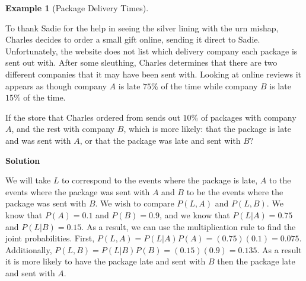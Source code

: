 \documentclass[
  letterpaper,
  DIV=11,
  numbers=noendperiod]{scrreprt}
\theoremstyle{definition}
\theoremstyle{definition}
\theoremstyle{definition}
\newtheorem{example}{Example}[chapter]
\theoremstyle{remark}
\begin{document}
\begin{example}[Package Delivery
Times]\protect\hypertarget{exm-package-delivery-times}{}\label{exm-package-delivery-times}

To thank Sadie for the help in seeing the silver lining with the urn
mishap, Charles decides to order a small gift online, sending it direct
to Sadie. Unfortunately, the website does not list which delivery
company each package is sent out with. After some sleuthing, Charles
determines that there are two different companies that it may have been
sent with. Looking at online reviews it appears as though company \(A\)
is late \(75\%\) of the time while company \(B\) is late \(15\%\) of the
time.

If the store that Charles ordered from sends out \(10\%\) of packages
with company \(A\), and the rest with company \(B\), which is more
likely: that the package is late and was sent with \(A\), or that the
package was late and sent with \(B\)?

\begin{tcolorbox}[enhanced jigsaw, colback=white, breakable, rightrule=.15mm, leftrule=.75mm, toprule=.15mm, left=2mm, arc=.35mm, opacityback=0, bottomrule=.15mm]

\vspace{-3mm}\textbf{Solution}\vspace{3mm}

We will take \(L\) to correspond to the events where the package is
late, \(A\) to the events where the package was sent with \(A\) and
\(B\) to be the events where the package was sent with \(B\). We wish to
compare \(P(L, A)\) and \(P(L, B)\). We know that \(P(A) = 0.1\) and
\(P(B) = 0.9\), and we know that \(P(L|A) = 0.75\) and
\(P(L|B) = 0.15\). As a result, we can use the multiplication rule to
find the joint probabilities. First,
\(P(L, A) = P(L|A)P(A) = (0.75)(0.1) = 0.075\). Additionally,
\(P(L, B) = P(L|B)P(B) = (0.15)(0.9) = 0.135\). As a result it is more
likely to have the package late and sent with \(B\) then the package
late and sent with \(A\).\footnotemark{}

\end{tcolorbox}


\end{example}
\end{document}
